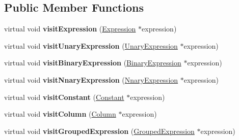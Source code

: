 \subsection*{Public Member Functions}
\begin{DoxyCompactItemize}
\item 
\hypertarget{class_expression_visitor_base_aeda112c1084f60e161b9b3c1a9cf0f5b}{virtual void {\bfseries visit\+Expression} (\hyperlink{class_expression}{Expression} $\ast$expression)}\label{class_expression_visitor_base_aeda112c1084f60e161b9b3c1a9cf0f5b}

\item 
\hypertarget{class_expression_visitor_base_a9750397f5588263509a28ca9f17e8bc4}{virtual void {\bfseries visit\+Unary\+Expression} (\hyperlink{class_unary_expression}{Unary\+Expression} $\ast$expression)}\label{class_expression_visitor_base_a9750397f5588263509a28ca9f17e8bc4}

\item 
\hypertarget{class_expression_visitor_base_aebbbbe9a1cecabe4c4804bf1ef82a9f9}{virtual void {\bfseries visit\+Binary\+Expression} (\hyperlink{class_binary_expression}{Binary\+Expression} $\ast$expression)}\label{class_expression_visitor_base_aebbbbe9a1cecabe4c4804bf1ef82a9f9}

\item 
\hypertarget{class_expression_visitor_base_a010c5ba36b255c8576a2b36aaf9692d8}{virtual void {\bfseries visit\+Nnary\+Expression} (\hyperlink{class_nnary_expression}{Nnary\+Expression} $\ast$expression)}\label{class_expression_visitor_base_a010c5ba36b255c8576a2b36aaf9692d8}

\item 
\hypertarget{class_expression_visitor_base_a64921e6a6a4945faf693e9ef8d6310a4}{virtual void {\bfseries visit\+Constant} (\hyperlink{class_constant}{Constant} $\ast$expression)}\label{class_expression_visitor_base_a64921e6a6a4945faf693e9ef8d6310a4}

\item 
\hypertarget{class_expression_visitor_base_a1ac638b82248ff9e1582dbf520dc6ae4}{virtual void {\bfseries visit\+Column} (\hyperlink{class_column}{Column} $\ast$expression)}\label{class_expression_visitor_base_a1ac638b82248ff9e1582dbf520dc6ae4}

\item 
\hypertarget{class_expression_visitor_base_aec22a7bb476fc79e7997d188423514c0}{virtual void {\bfseries visit\+Grouped\+Expression} (\hyperlink{class_grouped_expression}{Grouped\+Expression} $\ast$expression)}\label{class_expression_visitor_base_aec22a7bb476fc79e7997d188423514c0}

\end{DoxyCompactItemize}


